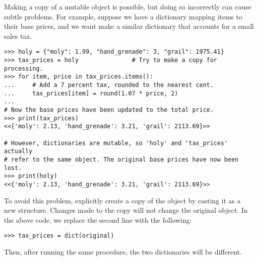 \begin{warn} %
Making a copy of a mutable object is possible, but doing so incorrectly can cause subtle problems.
For example, suppose we have a dictionary mapping items to their base prices, and we want make a similar dictionary that accounts for a small sales tax.

\begin{lstlisting}
>>> holy = {"moly": 1.99, "hand_grenade": 3, "grail": 1975.41}
>>> tax_prices = holy               # Try to make a copy for processing.
>>> for item, price in tax_prices.items():
...     # Add a 7 percent tax, rounded to the nearest cent.
...     tax_prices[item] = round(1.07 * price, 2)
...
# Now the base prices have been updated to the total price.
>>> print(tax_prices)
<<{'moly': 2.13, 'hand_grenade': 3.21, 'grail': 2113.69}>>

# However, dictionaries are mutable, so 'holy' and 'tax_prices' actually
# refer to the same object. The original base prices have now been lost.
>>> print(holy)
<<{'moly': 2.13, 'hand_grenade': 3.21, 'grail': 2113.69}>>
\end{lstlisting}

To avoid this problem, explicitly create a copy of the object by casting it as a new structure.
Changes made to the copy will not change the original object.
In the above code, we replace the second line with the following:

\begin{lstlisting}
>>> tax_prices = dict(original)
\end{lstlisting}
Then, after running the same procedure, the two dictionaries will be different.

\end{warn}

